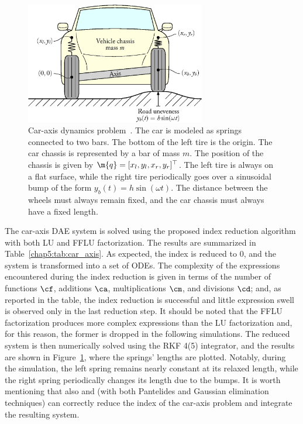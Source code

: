 \begin{figure}
  \centering
  \includegraphics[width=0.7\textwidth]{figures/chapter_5/car_axis}
  \caption{Car-axis dynamics problem~\cite{lioen1998test, mazzia2008test}. The car is modeled as springs connected to two bars. The bottom of the left tire is the origin. The car chassis is represented by a bar of mass $m$. The position of the chassis is given by $\m{q} = [x_l, y_l, x_r, y_r]^\top$. The left tire is always on a flat surface, while the right tire periodically goes over a sinusoidal bump of the form $y_b(t) = h\sin(\omega t)$. The distance between the wheels must always remain fixed, and the car chassis must always have a fixed length.}
  \label{chap5:fig:car_axis}
\end{figure}

The car-axis \ac{DAE} system is solved using the proposed index reduction algorithm with both \ac{LU} and \ac{FFLU} factorization. The results are summarized in Table~\ref{chap5:tab:car_axis}. As expected, the index is reduced to 0, and the system is transformed into a set of \acp{ODE}. The complexity of the expressions encountered during the index reduction is given in terms of the number of functions $\cf$, additions $\ca$, multiplications $\cm$, and divisions $\cd$; and, as reported in the table, the index reduction is successful and little expression swell is observed only in the last reduction step. It should be noted that the \ac{FFLU} factorization produces more complex expressions than the \ac{LU} factorization and, for this reason, the former is dropped in the following simulations. The reduced system is then numerically solved using the \ac{RKF} 4(5) integrator, and the results are shown in Figure~\ref{chap5:fig:car_axis}, where the springs' lengths are plotted. Notably, during the simulation, the left spring remains nearly constant at its relaxed length, while the right spring periodically changes its length due to the bumps. It is worth mentioning that also \Mathematica{} and \Matlab{} (with both Pantelides and Gaussian elimination techniques) can correctly reduce the index of the car-axis problem and integrate the resulting system.

